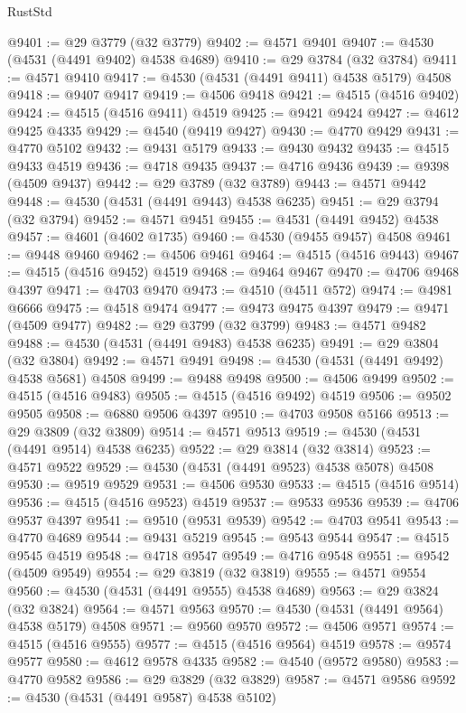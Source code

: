 \begin{lexlean}{RustStd}
\begin{coremodule}
{\begin{coremodule}
{{{{{{{{{{{{{{{{{{{{{{{{{{{{{{{{{{{{{{{{{{{{{{{{{{{{{{{@9401 := @29 @3779 (@32 @3779)
@9402 := @4571 @9401
@9407 := @4530 (@4531 (@4491 @9402) @4538 @4689)
@9410 := @29 @3784 (@32 @3784)
@9411 := @4571 @9410
@9417 := @4530 (@4531 (@4491 @9411) @4538 @5179) @4508
@9418 := @9407 @9417
@9419 := @4506 @9418
@9421 := @4515 (@4516 @9402)
@9424 := @4515 (@4516 @9411) @4519
@9425 := @9421 @9424
@9427 := @4612 @9425 @4335
@9429 := @4540 (@9419 @9427)
@9430 := @4770 @9429
@9431 := @4770 @5102
@9432 := @9431 @5179
@9433 := @9430 @9432
@9435 := @4515 @9433 @4519
@9436 := @4718 @9435
@9437 := @4716 @9436
@9439 := @9398 (@4509 @9437)
@9442 := @29 @3789 (@32 @3789)
@9443 := @4571 @9442
@9448 := @4530 (@4531 (@4491 @9443) @4538 @6235)
@9451 := @29 @3794 (@32 @3794)
@9452 := @4571 @9451
@9455 := @4531 (@4491 @9452) @4538
@9457 := @4601 (@4602 @1735)
@9460 := @4530 (@9455 @9457) @4508
@9461 := @9448 @9460
@9462 := @4506 @9461
@9464 := @4515 (@4516 @9443)
@9467 := @4515 (@4516 @9452) @4519
@9468 := @9464 @9467
@9470 := @4706 @9468 @4397
@9471 := @4703 @9470
@9473 := @4510 (@4511 @572)
@9474 := @4981 @6666
@9475 := @4518 @9474
@9477 := @9473 @9475 @4397
@9479 := @9471 (@4509 @9477)
@9482 := @29 @3799 (@32 @3799)
@9483 := @4571 @9482
@9488 := @4530 (@4531 (@4491 @9483) @4538 @6235)
@9491 := @29 @3804 (@32 @3804)
@9492 := @4571 @9491
@9498 := @4530 (@4531 (@4491 @9492) @4538 @5681) @4508
@9499 := @9488 @9498
@9500 := @4506 @9499
@9502 := @4515 (@4516 @9483)
@9505 := @4515 (@4516 @9492) @4519
@9506 := @9502 @9505
@9508 := @6880 @9506 @4397
@9510 := @4703 @9508 @5166
@9513 := @29 @3809 (@32 @3809)
@9514 := @4571 @9513
@9519 := @4530 (@4531 (@4491 @9514) @4538 @6235)
@9522 := @29 @3814 (@32 @3814)
@9523 := @4571 @9522
@9529 := @4530 (@4531 (@4491 @9523) @4538 @5078) @4508
@9530 := @9519 @9529
@9531 := @4506 @9530
@9533 := @4515 (@4516 @9514)
@9536 := @4515 (@4516 @9523) @4519
@9537 := @9533 @9536
@9539 := @4706 @9537 @4397
@9541 := @9510 (@9531 @9539)
@9542 := @4703 @9541
@9543 := @4770 @4689
@9544 := @9431 @5219
@9545 := @9543 @9544
@9547 := @4515 @9545 @4519
@9548 := @4718 @9547
@9549 := @4716 @9548
@9551 := @9542 (@4509 @9549)
@9554 := @29 @3819 (@32 @3819)
@9555 := @4571 @9554
@9560 := @4530 (@4531 (@4491 @9555) @4538 @4689)
@9563 := @29 @3824 (@32 @3824)
@9564 := @4571 @9563
@9570 := @4530 (@4531 (@4491 @9564) @4538 @5179) @4508
@9571 := @9560 @9570
@9572 := @4506 @9571
@9574 := @4515 (@4516 @9555)
@9577 := @4515 (@4516 @9564) @4519
@9578 := @9574 @9577
@9580 := @4612 @9578 @4335
@9582 := @4540 (@9572 @9580)
@9583 := @4770 @9582
@9586 := @29 @3829 (@32 @3829)
@9587 := @4571 @9586
@9592 := @4530 (@4531 (@4491 @9587) @4538 @5102)
}}}}}}}}}}}}}}}}}}}}}}}}}}}}}}}}}}}}}}}}}}}}}}}}}}}}}}}
\end{coremodule}}
\end{coremodule}
\end{lexlean}
